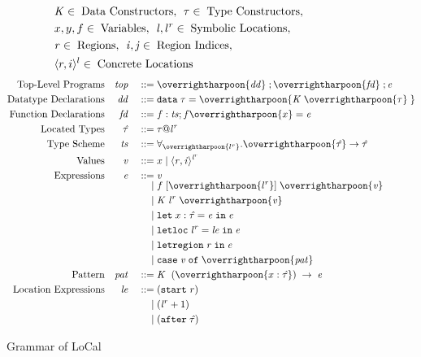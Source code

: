\documentclass[showabstract,showacknowledgments,showpreface,showdedication,school]{iuphd}
\makeatletter
\theoremstyle{nonumberplain}
\newcommand{\sysname}[0]{LoCal\xspace}
\newcommand{\ourcalc}[0]{\sysname}
\newcommand{\gramdef}{\; ::= \;}
\newcommand{\gramor}{\; | \;}
\newcommand{\keywd}[1]{\mathit{#1}}
\newcommand{\gramwd}[1]{\texttt{#1}}
\newcommand{\skeywd}[1]{\mathit{#1}}
\newcommand{\PROG}{\keywd{top}}
\newcommand{\DD}{\keywd{dd}}
\newcommand{\FD}{\keywd{fd}}
\newcommand{\DC}{\keywd{K}}
\newcommand{\EXPR}{\keywd{e}}
\newcommand{\DATA}{\gramwd{data}}
\newcommand{\TYP}{\keywd{\tau}}
\newcommand{\hTYP}{\keywd{\hat{\tau}}}
\newcommand{\sTYP}{\skeywd{\tau}}
\newcommand{\var}{\svar}
\newcommand{\svar}{x}
\newcommand{\fvar}{\sfvar}
\newcommand{\sfvar}{f}
\newcommand{\yvar}{y}
\newcommand{\ARROW}{\rightarrow}
\newcommand{\loc}{\skeywd{l}}
\newcommand{\concreteloc}[3]{\ensuremath{\langle #1, #2 \rangle ^{#3}}}
\newcommand{\reg}{\skeywd{r}}
\newcommand{\LE}{\keywd{le}}
\newcommand{\letpack}[3]{\gramwd{let}\;#1=#2\;\gramwd{in}\;#3}
\newcommand{\letloc}[3]{\gramwd{letloc}\;#1 = #2\;\gramwd{in}\;#3}
\newcommand{\letreg}[2]{\gramwd{letregion}\;#1\;\gramwd{in}\;#2}
\newcommand{\fapp}[2]{\fvar \;[#1]\; #2}
\newcommand{\TS}{\keywd{ts}}
\newcommand{\pat}{\keywd{pat}}
\newcommand{\ind}{\keywd{i}}
\newcommand{\indj}{\keywd{j}}
\newcommand{\VAL}{\keywd{v}}
\newcommand{\caseclause}[2]{#1 \;\rightarrow \;#2}
\newcommand{\case}[2]{\gramwd{case}\; #1 \;\gramwd{of}\;#2}
\newcommand{\datacon}[3]{\ensuremath{#1 \;#2 \;#3}}
\newcommand{\startr}[1]{(\gramwd{start}\; #1)}
\newcommand{\afterl}[1]{(\gramwd{after}\; #1)}
\newcommand{\locreg}[2]{\ensuremath{{#1}^{#2}}}
\newcommand{\tyatlocreg}[3]{#1 \ensuremath{@} \locreg{#2}{#3}}
\newcommand{\overharpoon}[1]{\overrightharpoon{#1}}
\makeatother
\begin{document}
\begin{figure}
  \begin{displaymath}
  \begin{aligned}
  &\DC \in \; \textup{Data Constructors},\:\: \TYP \in \; \textup{Type Constructors},\\
  &\var, \yvar,\fvar \in \; \textup{Variables},\:\:
  \loc, \locreg{l}{r} \in \; \textup{Symbolic Locations},\\
  &\reg \in \; \textup{Regions},\:\: \ind, \indj \in \; \textup{Region Indices},\\
  &\concreteloc{r}{i}{l} \in \; \textup{Concrete Locations}
  \end{aligned}
\end{displaymath}
\begin{displaymath}
  \begin{aligned}
    \textup{Top-Level Programs} && \PROG && \gramdef & \overharpoon{\DD} \;; \overharpoon{\FD} \;; \EXPR \\
    \textup{Datatype Declarations} && \DD && \gramdef & \DATA\;\TYP = \overharpoon{\DC \; \overharpoon{\sTYP}\;} \\
    \textup{Function Declarations} && \FD && \gramdef & \fvar : \TS ; \fvar \overharpoon{\var} = \EXPR \\
    \textup{Located Types} && \hTYP && \gramdef & \tyatlocreg{\TYP}{\loc}{\reg} \\
    \textup{Type Scheme} && \TS && \gramdef &
      \forall _{\overharpoon{\locreg{l}{r}}}.
      \overharpoon{\hTYP} \ARROW \hTYP \\
    \textup{Values} && \VAL && \gramdef & \var \gramor \concreteloc{\reg}{\ind}{\locreg{\loc}{\reg}}\\
    \textup{Expressions} && \EXPR && \gramdef & \VAL\\[-5pt]
    && && \gramor & \fapp{\overharpoon{\locreg{l}{r}}}{\overharpoon{\VAL}} \\
    && && \gramor & \datacon{\DC}{\keywd{\locreg{\loc}{\reg}}}{\overharpoon{\VAL}}\\
    && && \gramor & \letpack{\var:\hTYP}{\EXPR}{\EXPR} \\
    && && \gramor & \letloc{\locreg{\loc}{\reg}}{\LE}{\EXPR} \\
    && && \gramor & \letreg{\reg}{\EXPR} \\
    && && \gramor & \case{\VAL}{\overharpoon{\pat}} \\
    \textup{Pattern} && \pat && \gramdef &
    \caseclause{\datacon{\DC}{}{(\overharpoon{\var : \hTYP})}}{\EXPR} \\
    \textup{Location Expressions} && \LE && \gramdef
    & \startr{\reg} \\
    && && \gramor & (\locreg{\loc}{r} + 1) \\
    && && \gramor & \afterl{\hTYP}
  \end{aligned}
\end{displaymath}

  \caption{Grammar of \ourcalc{}}
  \label{fig:grammar}
\end{figure}
\end{document}
